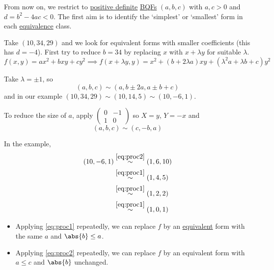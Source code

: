 \documentclass{article}
\begin{document}
From now on, we restrict to \hyperlink{def:definite}{positive definite} \hyperlink{def:bqf}{BQFs} $(a, b, c)$ with $a,c>0$ and $d = b^2 - 4 ac < 0$.
The first aim is to identify the `simplest' or `smallest' form in each \hyperlink{def:uniSub}{equivalence} class.
\begin{eg}
    Take $(10, 34, 29)$ and we look for equivalent forms with smaller coefficients (this has $d=-4$).
    First try to reduce $b=34$ by replacing $x$ with $x + \lambda y$ for suitable $\lambda$.
    \begin{equation*}
        f(x, y) = a x^2 + b x y + c y^2 \implies f(x + \lambda y, y) = x^2 + (b + 2 \lambda a) x y + (\lambda^2 a + \lambda b + c) y^2
    \end{equation*}

    Take $\lambda = \pm 1$, so
    \begin{equation*}
        (a, b, c) \sim (a, b \pm 2a, a \pm b + c) \tag{$*$} \label{eq:proc1}
    \end{equation*}
    and in our example $(10, 34, 29) \sim (10, 14, 5) \sim (10, -6, 1)$.

    To reduce the size of $a$, apply $\begin{pmatrix}0 & -1 \\ 1 & 0\end{pmatrix}$ so $X = y$, $Y = -x$ and
    \begin{equation*}
        (a, b, c) \sim (c, -b, a) \tag{$**$} \label{eq:proc2}
    \end{equation*}

    In the example,
    \begin{align*}
        (10, -6, 1) &\overset{\eqref{eq:proc2}}{\sim} (1, 6, 10) \\
                    &\overset{\eqref{eq:proc1}}{\sim} (1, 4, 5) \\
                    &\overset{\eqref{eq:proc1}}{\sim} (1, 2, 2) \\
                    &\overset{\eqref{eq:proc1}}{\sim} (1, 0, 1)
    \end{align*}
\end{eg}

\begin{remark}\leavevmode
    \begin{itemize}
        \item Applying \eqref{eq:proc1} repeatedly, we can replace $f$ by an \hyperlink{def:uniSub}{equivalent} form with the same $a$ and $\abs{b} \leq a$.
        \item Applying \eqref{eq:proc2} repeatedly, we can replace $f$ by an equivalent form with $a \leq c$ and $\abs{b}$ unchanged.
    \end{itemize}
\end{remark}
\end{document}
